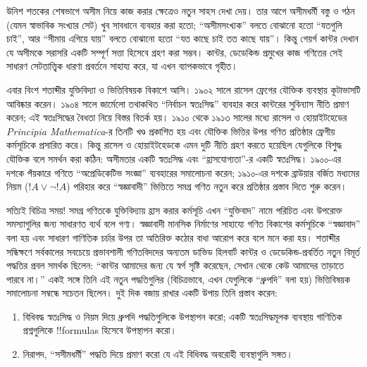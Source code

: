 \documentclass[../../../include/open-logic-section]{subfiles}
\begin{document}
উনিশ শতকের শেষভাগে অসীম নিয়ে কাজ করার ক্ষেত্রেও নতুন সাহস দেখা দেয়। তার
আগে অসীমধর্মী বস্তু ও গঠন (যেমন স্বাভাবিক সংখ্যার সেট) খুব সাবধানে ব্যবহার করা
হতো; ``অসীমসংখ্যক'' বলতে বোঝানো হতো ``যতগুলি চাই'', আর ``সীমায় এগিয়ে যায়''
বলতে বোঝানো হতো ``যত কাছে চাই তত কাছে যায়''। কিন্তু গেয়র্গ কান্টর দেখান যে
অসীমকে সরাসরি একটি সম্পূর্ণ সত্তা হিসেবে গ্রহণ করা সম্ভব। কান্টর, ডেডেকিন্ড
প্রমুখের কাজ গণিতের সেই সাধারণ সেটতাত্ত্বিক ধারণা প্রবর্তনে সাহায্য করে, যা এখন
ব্যাপকভাবে গৃহীত।

এবার বিংশ শতাব্দীর যুক্তিবিদ্যা ও ভিত্তিবিষয়ক বিকাশে আসি। ১৯০২ সালে রাসেল
ফ্রেগের যৌক্তিক ব্যবস্থায় কূটাভাসটি আবিষ্কার করেন। ১৯০৪ সালে জার্মেলো তথাকথিত
``নির্বাচন স্বতঃসিদ্ধ'' ব্যবহার করে কান্টরের সুবিন্যাস নীতি প্রমাণ করেন; এই
স্বতঃসিদ্ধের বৈধতা নিয়ে বিস্তর বিতর্ক হয়। ১৯১০ থেকে ১৯১৩ সালের মধ্যে রাসেল
ও হোয়াইটহেডের \emph{Principia Mathematica}-র তিনটি খণ্ড প্রকাশিত হয় এবং
যৌক্তিক ভিত্তির উপর গণিত প্রতিষ্ঠার ফ্রেগীয় কর্মসূচিকে প্রসারিত করে। কিন্তু
রাসেল ও হোয়াইটহেডকে এমন দুটি নীতি গ্রহণ করতে হয়েছিল যেগুলিকে বিশুদ্ধ যৌক্তিক
বলে সমর্থন করা কঠিন: অসীমতার একটি স্বতঃসিদ্ধ এবং ``হ্রাসযোগ্যতা''-র একটি
স্বতঃসিদ্ধ। ১৯০০-এর দশকে পঁয়কারে গণিতে ``অপ্রেডিকেটিভ সংজ্ঞা'' ব্যবহারের
সমালোচনা করেন; ১৯১০-এর দশকে ব্রাউয়ার বর্জিত মধ্যমের নিয়ম
($!A \lor \lnot !A$) পরিহার করে ``স্বজ্ঞাবাদী'' ভিত্তিতে সমগ্র গণিত নতুন করে
প্রতিষ্ঠার প্রস্তাব দিতে শুরু করেন।

সত্যিই বিচিত্র সময়!{} সমগ্র গণিতকে যুক্তিবিদ্যায় হ্রাস করার কর্মসূচি এখন
``যুক্তিবাদ'' নামে পরিচিত এবং উপরোক্ত সমস্যাগুলির জন্য সাধারণত ব্যর্থ বলে গণ্য।
স্বজ্ঞাবাদী মানসিক নির্মাণের সাহায্যে গণিত বিকাশের কর্মসূচিকে ``স্বজ্ঞাবাদ'' বলা
হয় এবং সাধারণ গাণিতিক চর্চার উপর তা অতিরিক্ত কঠোর বাধা আরোপ করে বলে মনে করা
হয়। শতাব্দীর সন্ধিক্ষণে সর্বকালের সবচেয়ে প্রভাবশালী গণিতবিদদের অন্যতম ডাভিড
হিলবার্ট কান্টর ও ডেডেকিন্ড-প্রবর্তিত নতুন বিমূর্ত পদ্ধতির প্রবল সমর্থক ছিলেন:
``কান্টর আমাদের জন্য যে স্বর্গ সৃষ্টি করেছেন, সেখান থেকে কেউ আমাদের তাড়াতে
পারবে না।'' একই সঙ্গে তিনি এই নতুন পদ্ধতিগুলির (বিচিত্রভাবে, এখন যেগুলিকে
``ধ্রুপদি'' বলা হয়) ভিত্তিবিষয়ক সমালোচনা সম্বন্ধে সচেতন ছিলেন। দুই দিক বজায়
রাখার একটি উপায় তিনি প্রস্তাব করেন:
\begin{enumerate}
\item বিধিবদ্ধ স্বতঃসিদ্ধ ও নিয়ম দিয়ে ধ্রুপদি পদ্ধতিগুলিকে উপস্থাপন করো;
  একটি স্বতঃসিদ্ধমূলক ব্যবস্থায় গাণিতিক প্রশ্নগুলিকে !!{formula}s হিসেবে
  উপস্থাপন করো।
\item নিরাপদ, ``সসীমধর্মী'' পদ্ধতি দিয়ে প্রমাণ করো যে এই বিধিবদ্ধ
  অবরোহী ব্যবস্থাগুলি সঙ্গত।
\end{enumerate}
\end{document}
